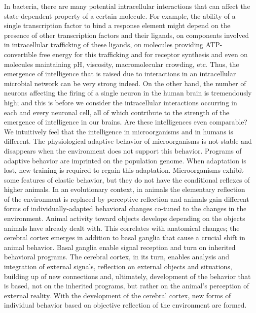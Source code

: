 In bacteria, there are many potential intracellular interactions that can affect the state-dependent property of a certain molecule. For example, the ability of a single transcription factor to bind a response element might depend on the presence of other transcription factors and their ligands, on components involved in intracellular trafficking of these ligands, on molecules providing ATP-convertible free energy for this trafficking and for receptor synthesis and even on molecules maintaining pH, viscosity, macromolecular crowding, etc. Thus, the emergence of intelligence that is raised due to interactions in an intracellular microbial network can be very strong indeed. On the other hand, the number of neurons affecting the firing of a single neuron in the human brain is tremendously high; and this is before we consider the intracellular interactions occurring in each and every neuronal cell, all of which contribute to the strength of the emergence of intelligence in our brains. Are these intelligences even comparable? We intuitively feel that the intelligence in microorganisms and in humans is different. 
The physiological adaptive behavior of microorganisms is not stable and disappears when the environment does not support this behavior. Programs of adaptive behavior are imprinted on the population genome. When adaptation is lost, new training is required to regain this adaptation. Microorganisms exhibit some features of elastic behavior, but they do not have the conditional reflexes of higher animals. In an evolutionary context, in animals the elementary reflection of the environment is replaced by perceptive reflection and animals gain different forms of individually-adapted behavioral changes co-tuned to the changes in the environment. Animal activity toward objects develops depending on the objects animals have already dealt with. This correlates with anatomical changes; the cerebral cortex emerges in addition to basal ganglia that cause a crucial shift in animal behavior. Basal ganglia enable signal reception and turn on inherited behavioral programs. The cerebral cortex, in its turn, enables analysis and integration of external signals, reflection on external objects and situations, building up of new connections and, ultimately, development of the behavior that is based, not on the inherited programs, but rather on the animal’s perception of external reality. With the development of the cerebral cortex, new forms of individual behavior based on objective reflection of the environment are formed.

